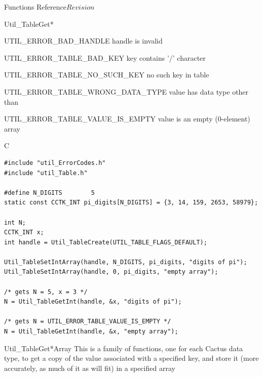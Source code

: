 \begin{cactuspart}{ Functions Reference}{}{$Revision$}
\begin{FunctionDescription}{Util\_TableGet*}
\begin{ErrorSection}
\begin{Error}{UTIL\_ERROR\_BAD\_HANDLE}
handle is invalid
\end{Error}
\begin{Error}{UTIL\_ERROR\_TABLE\_BAD\_KEY}
key contains '/' character
\end{Error}
\begin{Error}{UTIL\_ERROR\_TABLE\_NO\_SUCH\_KEY}
no such key in table
\end{Error}
\begin{Error}{UTIL\_ERROR\_TABLE\_WRONG\_DATA\_TYPE}
value has data type other than 
\end{Error}
\begin{Error}{UTIL\_ERROR\_TABLE\_VALUE\_IS\_EMPTY}
value is an empty (0-element) array
\end{Error}
\end{ErrorSection}

\begin{ExampleSection}
\begin{Example}{C}
\begin{verbatim}
#include "util_ErrorCodes.h"
#include "util_Table.h"

#define N_DIGITS        5
static const CCTK_INT pi_digits[N_DIGITS] = {3, 14, 159, 2653, 58979};

int N;
CCTK_INT x;
int handle = Util_TableCreate(UTIL_TABLE_FLAGS_DEFAULT);

Util_TableSetIntArray(handle, N_DIGITS, pi_digits, "digits of pi");
Util_TableSetIntArray(handle, 0, pi_digits, "empty array");

/* gets N = 5, x = 3 */
N = Util_TableGetInt(handle, &x, "digits of pi");

/* gets N = UTIL_ERROR_TABLE_VALUE_IS_EMPTY */
N = Util_TableGetInt(handle, &x, "empty array");
\end{verbatim}
\end{Example}
\end{ExampleSection}
\end{FunctionDescription}


\begin{FunctionDescription}{Util\_TableGet*Array}
\label{Util-TableGet*Array}
This is a family of functions, one for each Cactus data type,
to get a copy of the value associated with a specified key, and store
it (more accurately, as much of it as will fit) in a specified array


\end{FunctionDescription}
\end{cactuspart}
